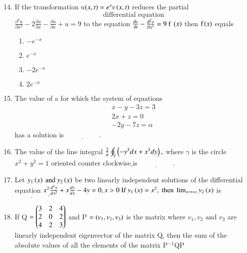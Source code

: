 \documentclass[journal]{IEEEtran}
\begin{document}
\begin{enumerate}
\setcounter{enumi}{13}

\item If the transformation u$\left(x,t\right)=e^{x}v\left(x,t\right)$ reduces the partial $$ \text{ differential equation }$$ $\frac{\partial^{2}u}{\partial x^{2}}-2\frac{\partial u}{\partial x}-\frac{\partial u}{\partial x}+u=9$  to the equation $\frac{\partial v}{\partial t}-\frac{\partial^{2}v}{\partial x^{2}}=9 \text{ f }\left(x\right)$ then $\text{f}\left(x\right)$ equals 

\begin{multicols}{4}
    \begin{enumerate}
        \item $-e^{-x}$
        \item $e^{-x}$
        \item $-2e^{-x}$
        \item $2e^{-x}$
    \end{enumerate}
\end{multicols}

\bigskip

\item The value of a for which the system of equations 
\begin{align*}
    x-y-3z=3\\
    2x+z=0\\
    -2y-7z=\alpha
\end{align*}
has a solution is $\underline{\hspace{2cm}}.$
\bigskip

\item The value of the line integral $\frac{2}{\pi}\oint_{\gamma}\left(-y^{3}dx+x^{3}dy\right),$ where $\gamma$ is the circle $x^{2}+y^{2}=1$ oriented counter clockwise,is $\underline{\hspace{2cm}}.$
\bigskip

\item Let $y_{1}\left(x\right)\text{ and } y_{2}\left(x\right)$  be two linearly independent solutions of the differential equation $x^{2}\frac{d^{2}y}{dx^{2}}+x\frac{dy}{dx}-4y=0,x>0\text{ If } y_{1}\left(x\right)=x^{2},\text{ then }\lim_{x\to\infty}y_{2}\left(x\right)$ is $\underline{\hspace{2cm}}.$
\bigskip

\item If Q $= \begin{pmatrix}3&2&4\\2&0&2\\4&2&3\end{pmatrix} $ and P $=\left(v_{1},v_{2},v_{3}\right)$ is the matrix where $v_{1},v_{2}\text{ and }v_{3}$ are linearly independent eigenvector of the matrix Q, then the sum of the absolute values of all the elements of the matrix P$^{-1}$QP


\end{enumerate}
\end{document}
